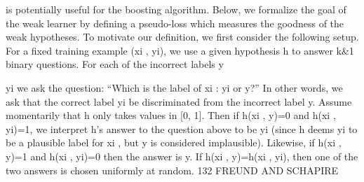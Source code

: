 \documentclass[10pt]{article}
\begin{document}
\begin{ReviewVerbatim}
is potentially useful for the boosting algorithm.
Below, we formalize the goal of the weak learner by
defining a pseudo-loss which measures the goodness of the
weak hypotheses. To motivate our definition, we first
consider the following setup. For a fixed training example
(xi , yi), we use a given hypothesis h to answer k&1 binary
questions. For each of the incorrect labels y{ yi we ask the
question:
``Which is the label of xi : yi or y?''
In other words, we ask that the correct label yi be
discriminated from the incorrect label y.
Assume momentarily that h only takes values in [0, 1].
Then if h(xi , y)=0 and h(xi , yi)=1, we interpret h's
answer to the question above to be yi (since h deems yi to
be a plausible label for xi , but y is considered implausible).
Likewise, if h(xi , y)=1 and h(xi , yi)=0 then the answer is
y. If h(xi , y)=h(xi , yi), then one of the two answers is
chosen uniformly at random.
132 FREUND AND SCHAPIRE

}
\end{ReviewVerbatim}
\end{document}
